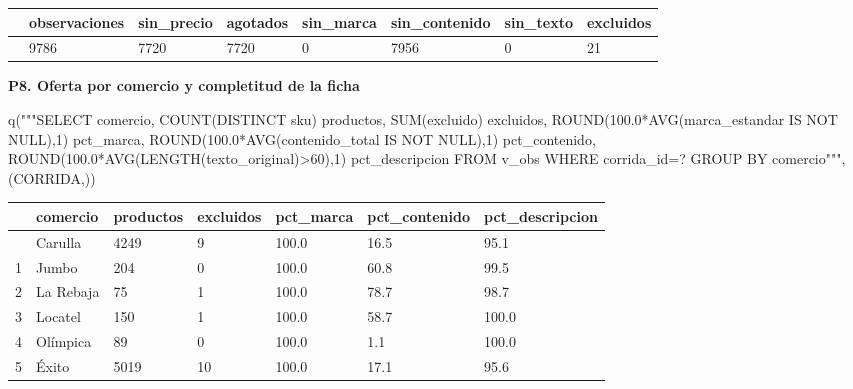 \documentclass[
  spanish,
  letterpaper,
  DIV=11,
  numbers=noendperiod]{scrartcl}
\newenvironment{Shaded}{\begin{snugshade}}{\end{snugshade}}
\newcommand{\NormalTok}[1]{\textcolor[rgb]{0.00,0.23,0.31}{#1}}
\newcommand{\StringTok}[1]{\textcolor[rgb]{0.13,0.47,0.30}{#1}}
\newcounter{none} %
\begin{document}
{\def\LTcaptype{none} %
\begin{longtable}[]{@{}llllllll@{}}
\toprule\noalign{}
& observaciones & sin\_precio & agotados & sin\_marca & sin\_contenido &
sin\_texto & excluidos \\
\midrule\noalign{}
\endhead
\bottomrule\noalign{}
\endlastfoot
0 & 9786 & 7720 & 7720 & 0 & 7956 & 0 & 21 \\
\end{longtable}
}

\textbf{P8. Oferta por comercio y completitud de la ficha}

\begin{Shaded}
\begin{Highlighting}[]
\NormalTok{q(}\StringTok{"""SELECT comercio, COUNT(DISTINCT sku) productos, SUM(excluido) excluidos,}
\StringTok{ ROUND(100.0*AVG(marca\_estandar IS NOT NULL),1) pct\_marca,}
\StringTok{ ROUND(100.0*AVG(contenido\_total IS NOT NULL),1) pct\_contenido,}
\StringTok{ ROUND(100.0*AVG(LENGTH(texto\_original)\textgreater{}60),1) pct\_descripcion}
\StringTok{FROM v\_obs WHERE corrida\_id=? GROUP BY comercio"""}\NormalTok{, (CORRIDA,))}
\end{Highlighting}
\end{Shaded}

{\def\LTcaptype{none} %
\begin{longtable}[]{@{}lllllll@{}}
\toprule\noalign{}
& comercio & productos & excluidos & pct\_marca & pct\_contenido &
pct\_descripcion \\
\midrule\noalign{}
\endhead
\bottomrule\noalign{}
\endlastfoot
0 & Carulla & 4249 & 9 & 100.0 & 16.5 & 95.1 \\
1 & Jumbo & 204 & 0 & 100.0 & 60.8 & 99.5 \\
2 & La Rebaja & 75 & 1 & 100.0 & 78.7 & 98.7 \\
3 & Locatel & 150 & 1 & 100.0 & 58.7 & 100.0 \\
4 & Olímpica & 89 & 0 & 100.0 & 1.1 & 100.0 \\
5 & Éxito & 5019 & 10 & 100.0 & 17.1 & 95.6 \\
\end{longtable}
}
\end{document}
